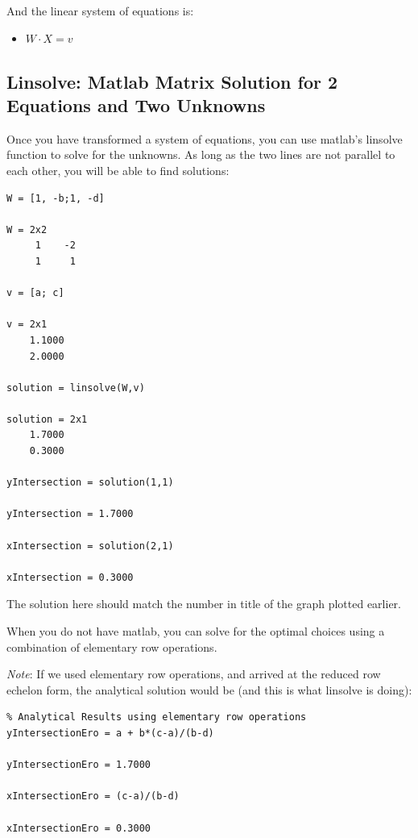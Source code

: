 \documentclass[
]{book}
\providecommand{\tightlist}{%
  \setlength{\itemsep}{0pt}\setlength{\parskip}{0pt}}
\begin{document}
And the linear system of equations is:

\begin{itemize}
\tightlist
\item
  \(\displaystyle W\cdot X=v\)
\end{itemize}

\hypertarget{linsolve-matlab-matrix-solution-for-2-equations-and-two-unknowns}{%
\subsection{Linsolve: Matlab Matrix Solution for 2 Equations and Two Unknowns}\label{linsolve-matlab-matrix-solution-for-2-equations-and-two-unknowns}}

Once you have transformed a system of equations, you can use matlab's
linsolve function to solve for the unknowns. As long as the two lines
are not parallel to each other, you will be able to find solutions:

\begin{verbatim}
W = [1, -b;1, -d]

W = 2x2    
     1    -2
     1     1

v = [a; c]

v = 2x1    
    1.1000
    2.0000

solution = linsolve(W,v)

solution = 2x1    
    1.7000
    0.3000

yIntersection = solution(1,1)

yIntersection = 1.7000

xIntersection = solution(2,1)

xIntersection = 0.3000
\end{verbatim}

The solution here should match the number in title of the graph plotted
earlier.

When you do not have matlab, you can solve for the optimal choices using
a combination of elementary row operations.

\emph{Note}: If we used elementary row operations, and arrived at the reduced
row echelon form, the analytical solution would be (and this is what
linsolve is doing):

\begin{verbatim}
% Analytical Results using elementary row operations
yIntersectionEro = a + b*(c-a)/(b-d)

yIntersectionEro = 1.7000

xIntersectionEro = (c-a)/(b-d)

xIntersectionEro = 0.3000
\end{verbatim}
\end{document}
